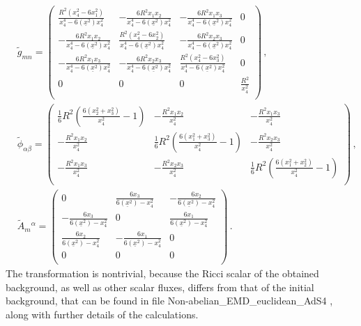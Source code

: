 \documentclass[12pt, utf8]{article}
\numberwithin{equation}{section}
\begin{document}
\begin{equation}
    \begin{aligned}
    &    \tilde{g}_{m n} = \left(
\begin{array}{cccc}
 \frac{R^2 \left(x_4^2-6 x_1^2\right)}{x_4^4-6 \left(\underline{x}^2\right) x_4^2} & -\frac{6 R^2 x_1 x_2}{x_4^4-6 \left(\underline{x}^2\right) x_4^2} & -\frac{6 R^2 x_1 x_3}{x_4^4-6 \left(\underline{x}^2\right) x_4^2} & 0 \\
 -\frac{6 R^2 x_1 x_2}{x_4^4-6 \left(\underline{x}^2\right) x_4^2} & \frac{R^2 \left(x_4^2-6 x_2^2\right)}{x_4^4-6 \left(\underline{x}^2\right) x_4^2} & -\frac{6 R^2 x_2 x_3}{x_4^4-6 \left(\underline{x}^2\right) x_4^2} & 0 \\
 -\frac{6 R^2 x_1 x_3}{x_4^4-6 \left(\underline{x}^2\right) x_4^2} & -\frac{6 R^2 x_2 x_3}{x_4^4-6 \left(\underline{x}^2\right) x_4^2} & \frac{R^2 \left(x_4^2-6 x_3^2\right)}{x_4^4-6 \left(\underline{x}^2\right) x_4^2} & 0 \\
 0 & 0 & 0 & \frac{R^2}{x_4^2} \\
\end{array}
\right) \, , \\
& \tilde{\phi}_{\alpha \beta} = \left(
\begin{array}{ccc}
 \frac{1}{6} R^2 \left(\frac{6 \left(x_2^2+x_3^2\right)}{x_4^2}-1\right) & -\frac{R^2 x_1 x_2}{x_4^2} & -\frac{R^2 x_1 x_3}{x_4^2} \\
 -\frac{R^2 x_1 x_2}{x_4^2} & \frac{1}{6} R^2 \left(\frac{6 \left(x_1^2+x_3^2\right)}{x_4^2}-1\right) & -\frac{R^2 x_2 x_3}{x_4^2} \\
 -\frac{R^2 x_1 x_3}{x_4^2} & -\frac{R^2 x_2 x_3}{x_4^2} & \frac{1}{6} R^2 \left(\frac{6 \left(x_1^2+x_2^2\right)}{x_4^2}-1\right) \\
\end{array}
\right) \, , \\
& \tilde{A}_{m}{}^{\alpha} = \left(
\begin{array}{ccc}
 0 & \frac{6 x_3}{6 \left(\underline{x}^2\right)-x_4^2} & -\frac{6 x_2}{6 \left(\underline{x}^2\right)-x_4^2} \\
 -\frac{6 x_3}{6 \left(\underline{x}^2\right)-x_4^2} & 0 & \frac{6 x_1}{6 \left(\underline{x}^2\right)-x_4^2} \\
 \frac{6 x_2}{6 \left(\underline{x}^2\right)-x_4^2} & -\frac{6 x_1}{6 \left(\underline{x}^2\right)-x_4^2} & 0 \\
 0 & 0 & 0 \\
\end{array}
\right) \, .
    \end{aligned}
\end{equation}
The transformation is nontrivial, because the Ricci scalar of the obtained background, as well as other scalar fluxes, differs from that of the initial background, that can be found in file Non-abelian\_EMD\_euclidean\_AdS4 \cite{Gubarev:2025nonabelianuni}, along with further details of the calculations.
\end{document}
